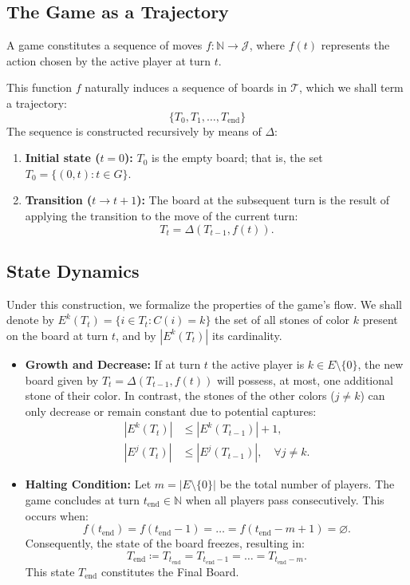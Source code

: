 \subsection{The Game as a Trajectory}
A game constitutes a sequence of moves $f : \mathbb{N} \to \mathcal{J}$, where $f(t)$ represents the action chosen by the active player at turn $t$.

This function $f$ naturally induces a sequence of boards in $\mathcal{T}$, which we shall term a trajectory:
$$\{T_0, T_1, \dots, T_{\mathrm{end}}\}$$
The sequence is constructed recursively by means of $\Delta$:

\begin{enumerate}
	\item \textbf{Initial state ($t=0$):} $T_0$ is the empty board; that is, the set $T_0 = \{(0, t) : t \in G\}$.
	\item \textbf{Transition ($t \rightarrow t+1$):} The board at the subsequent turn is the result of applying the transition to the move of the current turn:
	$$T_t = \Delta(T_{t-1}, f(t)).$$
	\end{enumerate}

\subsection{State Dynamics}\label{section_state_dynamic}

Under this construction, we formalize the properties of the game's flow. We shall denote by $E^k(T_t) = \{i \in T_t : C(i) = k\}$ the set of all stones of color $k$ present on the board at turn $t$, and by $|E^k(T_t)|$ its cardinality.

\begin{itemize}
	\item \textbf{Growth and Decrease:} If at turn $t$ the active player is $k \in E \setminus \{0\}$, the new board given by $T_t = \Delta(T_{t-1}, f(t))$ will possess, at most, one additional stone of their color. In contrast, the stones of the other colors ($j \neq k$) can only decrease or remain constant due to potential captures:
	\begin{align*}
		|E^k(T_t)| &\le |E^k(T_{t-1})| + 1,\\
		|E^j(T_t)| &\le |E^j(T_{t-1})|, \quad \forall j \neq k.
	\end{align*}
	
	\item \textbf{Halting Condition:} Let $m = |E \setminus \{0\}|$ be the total number of players. The game concludes at turn $t_{\mathrm{end}} \in \mathbb{N}$ when all players pass consecutively. This occurs when:
	$$f(t_{\mathrm{end}}) = f(t_{\mathrm{end}}-1) = \dots = f(t_{\mathrm{end}}-m+1) = \varnothing.$$
	Consequently, the state of the board freezes, resulting in:
	$$T_{\mathrm{end}} \coloneqq T_{t_{\mathrm{end}}} = T_{t_{\mathrm{end}}-1} = \dots = T_{t_{\mathrm{end}}-m}.$$
	This state $T_{\mathrm{end}}$ constitutes the Final Board.
\end{itemize}


